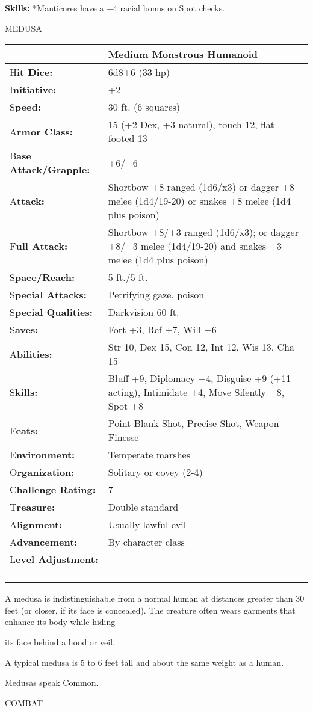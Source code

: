 \documentclass{article}
\begin{document}
\textbf{Skills: }*Manticores have a +4 racial bonus on Spot checks.

\vspace{12pt}
{\LARGE{}MEDUSA}

\begin{tabular}{|>{\raggedright}p{91pt}|>{\raggedright}p{233pt}|}
\hline
  & Medium Monstrous Humanoid\tabularnewline
\hline
H\textbf{it Dice:} & 6d8+6 (33 hp)\tabularnewline
\hline
I\textbf{nitiative:} & +2\tabularnewline
\hline
S\textbf{peed:} & 30 ft. (6 squares)\tabularnewline
\hline
A\textbf{rmor Class:} & 15 (+2 Dex, +3 natural), touch 12, flat-footed 13\tabularnewline
\hline
B\textbf{ase Attack/Grapple:} & +6/+6\tabularnewline
\hline
A\textbf{ttack:} & Shortbow +8 ranged (1d6/x3) or dagger +8 melee (1d4/19-20) or 
snakes +8 melee (1d4 plus poison)\tabularnewline
\hline
F\textbf{ull Attack:} & Shortbow +8/+3 ranged (1d6/x3); or dagger +8/+3 melee (1d4/19-20) 
and snakes +3 melee (1d4 plus poison)\tabularnewline
\hline
S\textbf{pace/Reach:} & 5 ft./5 ft.\tabularnewline
\hline
S\textbf{pecial Attacks:} & Petrifying gaze, poison\tabularnewline
\hline
S\textbf{pecial Qualities:} & Darkvision 60 ft.\tabularnewline
\hline
S\textbf{aves:} & Fort +3, Ref +7, Will +6\tabularnewline
\hline
A\textbf{bilities:} & Str 10, Dex 15, Con 12, Int 12, Wis 13, Cha 15\tabularnewline
\hline
S\textbf{kills:} & Bluff +9, Diplomacy +4, Disguise +9 (+11 acting), Intimidate 
+4, Move Silently +8, Spot +8\tabularnewline
\hline
F\textbf{eats:} & Point Blank Shot, Precise Shot, Weapon Finesse\tabularnewline
\hline
E\textbf{nvironment:} & Temperate marshes\tabularnewline
\hline
O\textbf{rganization:} & Solitary or covey (2-4)\tabularnewline
\hline
C\textbf{hallenge Rating:} & 7\tabularnewline
\hline
T\textbf{reasure:} & Double standard\tabularnewline
\hline
A\textbf{lignment:} & Usually lawful evil\tabularnewline
\hline
A\textbf{dvancement:} & By character class\tabularnewline
\hline
L\textbf{evel Adjustment:}--- & \tabularnewline
\hline
\end{tabular}

A medusa is indistinguishable from a normal human at distances greater than 30 
feet (or closer, if its face is concealed). The creature often wears garments that 
enhance its body while hiding

its face behind a hood or veil.

A typical medusa is 5 to 6 feet tall and about the same weight as a human.

Medusas speak Common.

COMBAT
\end{document}
